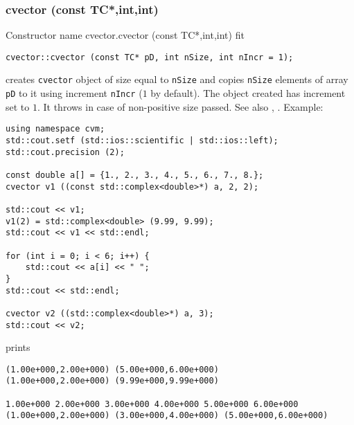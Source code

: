 \subsubsection{cvector (const TC*,int,int)}
Constructor%
\pdfdest name {cvector.cvector (const TC*,int,int)} fit
\begin{verbatim}
cvector::cvector (const TC* pD, int nSize, int nIncr = 1);
\end{verbatim}
creates  \verb"cvector" object of size equal to \verb"nSize"
and copies \verb"nSize" elements of
 array \verb"pD" to it using increment \verb"nIncr" ($1$ by default).
The object created has increment set to $1$.
It throws  
in case of non-positive size passed.
See also , .
Example:
\begin{Verbatim}
using namespace cvm;
std::cout.setf (std::ios::scientific | std::ios::left);
std::cout.precision (2);

const double a[] = {1., 2., 3., 4., 5., 6., 7., 8.};
cvector v1 ((const std::complex<double>*) a, 2, 2);

std::cout << v1;
v1(2) = std::complex<double> (9.99, 9.99);
std::cout << v1 << std::endl;

for (int i = 0; i < 6; i++) {
    std::cout << a[i] << " ";
}
std::cout << std::endl;

cvector v2 ((std::complex<double>*) a, 3);
std::cout << v2;
\end{Verbatim}
prints
\begin{Verbatim}
(1.00e+000,2.00e+000) (5.00e+000,6.00e+000)
(1.00e+000,2.00e+000) (9.99e+000,9.99e+000)

1.00e+000 2.00e+000 3.00e+000 4.00e+000 5.00e+000 6.00e+000
(1.00e+000,2.00e+000) (3.00e+000,4.00e+000) (5.00e+000,6.00e+000)
\end{Verbatim}
\newpage




